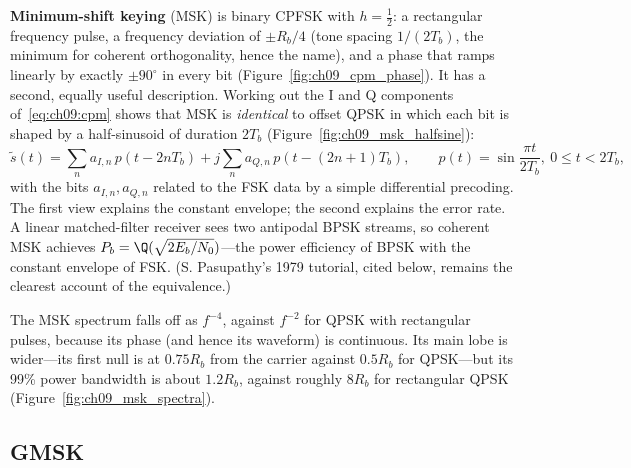 \textbf{Minimum-shift keying} (MSK) is binary CPFSK with $h=\tfrac12$:
a rectangular frequency pulse, a frequency deviation of $\pm R_b/4$ (tone spacing $1/(2T_b)$, the
minimum for coherent orthogonality, hence the name), and a phase that ramps linearly by exactly
$\pm90^\circ$ in every bit (Figure~\ref{fig:ch09_cpm_phase}). It has a second, equally useful
description. Working out the I and Q components of~\eqref{eq:ch09:cpm} shows that MSK is
\emph{identical} to offset QPSK in which each bit is shaped by a half-sinusoid of duration $2T_b$
(Figure~\ref{fig:ch09_msk_halfsine}):
\begin{equation}
\tilde s(t)=\sum_n a_{I,n}\,p(t-2nT_b)+j\sum_n a_{Q,n}\,p(t-(2n+1)T_b),\qquad
p(t)=\sin\frac{\pi t}{2T_b},\ 0\le t<2T_b ,
\label{eq:ch09:msk}
\end{equation}
with the bits $a_{I,n},a_{Q,n}$ related to the FSK data by a simple differential precoding. The
first view explains the constant envelope; the second explains the error rate. A linear
matched-filter receiver sees two antipodal BPSK streams, so coherent MSK achieves
$P_b=\Q(\sqrt{2E_b/N_0})$---the power efficiency of BPSK with the constant envelope of FSK. (S.
Pasupathy's 1979 tutorial, cited below, remains the clearest account of the equivalence.)


The MSK spectrum falls off as $f^{-4}$, against $f^{-2}$ for QPSK with rectangular pulses, because
its phase (and hence its waveform) is continuous. Its main lobe is wider---its first null is at
$0.75R_b$ from the carrier against $0.5R_b$ for QPSK---but its 99\% power bandwidth is about
$1.2R_b$, against roughly $8R_b$ for rectangular QPSK (Figure~\ref{fig:ch09_msk_spectra}).

\subsection{GMSK}

